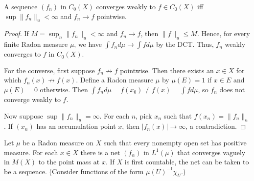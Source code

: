 \documentclass{article}
\begin{document}
 A sequence $(f_n)$ in $C_0(X)$ converges weakly to $f \in C_0(X)$ iff $\sup \|f_n\|_u < \infty$ and
$f_n \to f$ pointwise.
\begin{proof}
If $M = \sup_n \|f_n\|_u < \infty$ and $f_n \to f$,  then $\|f \|_u \le M$.  Hence, for every finite Radon measure $\mu$,
we have $\int f_n d\mu \to \int f d\mu$ by the DCT. Thus, $f_n$ weakly converges to $f$ in $C_0(X)$.

For the converse, first suppose $f_n \not \to f$ pointwise.  Then there exists an $x \in X$ for which
$f_n(x) \not\to f(x)$. Define a Radon measure $\mu$ by $\mu(E) = 1$ if $x \in E$ and $\mu(E) = 0$ otherwise. 
Then $\int f_n d\mu = f(x_0) \neq f(x) = \int f d\mu$, so $f_n$ does not converge weakly to $f$.

Now suppose $\sup \|f_n\|_u = \infty$. For each $n$, pick $x_n$ such that $f(x_n) = \|f_n\|_u$. If $(x_n)$ has an accumulation point $x$,
then $|f_n(x)| \to \infty$, a contradiction. 
\end{proof}


 Let $\mu$ be a Radon measure on $X$ such that every nonempty open set has positive measure. For each 
$x \in X$ there is a net $(f_\alpha)$ in $L^1(\mu)$ that converges vaguely in $M(X)$ to the point mass at $x$. If
$X$ is first countable, the net can be taken to be a sequence. (Consider functions of the form $\mu(U)^{-1} \chi_U$.)
\end{document}
